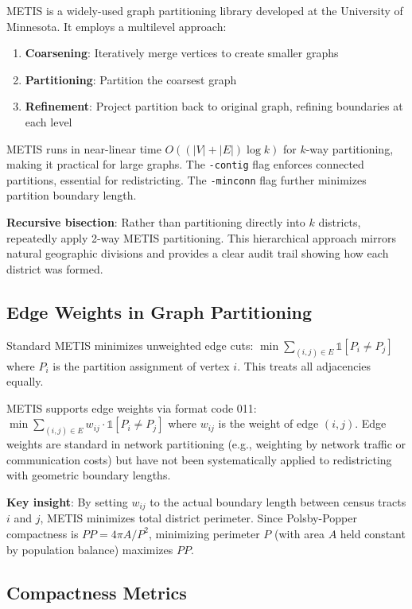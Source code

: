 METIS \cite{karypis1998metis,karypis1999parallel} is a widely-used graph partitioning library developed at the University of Minnesota. It employs a multilevel approach:

\begin{enumerate}
\item \textbf{Coarsening}: Iteratively merge vertices to create smaller graphs
\item \textbf{Partitioning}: Partition the coarsest graph
\item \textbf{Refinement}: Project partition back to original graph, refining boundaries at each level
\end{enumerate}

METIS runs in near-linear time $O((|V|+|E|)\log k)$ for $k$-way partitioning, making it practical for large graphs. The \texttt{-contig} flag enforces connected partitions, essential for redistricting. The \texttt{-minconn} flag further minimizes partition boundary length.

\textbf{Recursive bisection}: Rather than partitioning directly into $k$ districts, repeatedly apply 2-way METIS partitioning. This hierarchical approach mirrors natural geographic divisions and provides a clear audit trail showing how each district was formed.

\subsection{Edge Weights in Graph Partitioning}

Standard METIS minimizes unweighted edge cuts: $\min \sum_{(i,j) \in E} \mathbb{1}[P_i \neq P_j]$ where $P_i$ is the partition assignment of vertex $i$. This treats all adjacencies equally.

METIS supports edge weights via format code 011: $\min \sum_{(i,j) \in E} w_{ij} \cdot \mathbb{1}[P_i \neq P_j]$ where $w_{ij}$ is the weight of edge $(i,j)$. Edge weights are standard in network partitioning (e.g., weighting by network traffic or communication costs) but have not been systematically applied to redistricting with geometric boundary lengths.

\textbf{Key insight}: By setting $w_{ij}$ to the actual boundary length between census tracts $i$ and $j$, METIS minimizes total district perimeter. Since Polsby-Popper compactness is $PP = 4\pi A / P^2$, minimizing perimeter $P$ (with area $A$ held constant by population balance) maximizes $PP$.

\subsection{Compactness Metrics}

